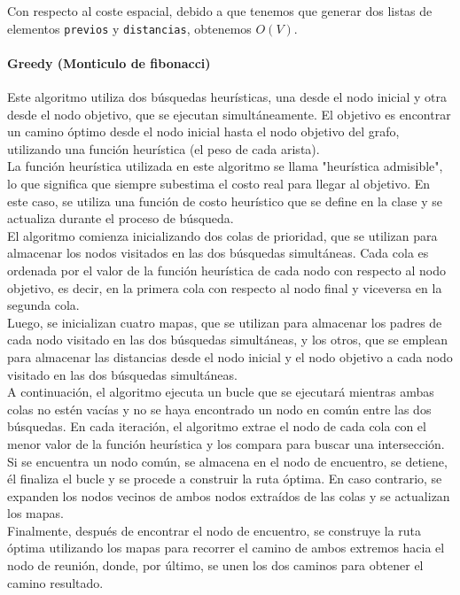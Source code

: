 Con respecto al coste espacial, debido a que tenemos que generar dos listas de elementos \texttt{previos} y \texttt{distancias}, obtenemos $O(V)$.

\paragraph{Greedy (Monticulo de fibonacci)}

Este algoritmo utiliza dos búsquedas heurísticas, una desde el nodo inicial y otra desde el nodo objetivo, que se ejecutan simultáneamente. El objetivo es encontrar un camino óptimo desde el nodo inicial hasta el nodo objetivo del grafo, utilizando una función heurística (el peso de cada arista).\\

La función heurística utilizada en este algoritmo se llama "heurística admisible", lo que significa que siempre subestima el costo real para llegar al objetivo. En este caso, se utiliza una función de costo heurístico que se define en la clase  y se actualiza durante el proceso de búsqueda.\\

El algoritmo comienza inicializando dos colas de prioridad, que se utilizan para almacenar los nodos visitados en las dos búsquedas simultáneas. Cada cola es ordenada por el valor de la función heurística de cada nodo con respecto al nodo objetivo, es decir, en la primera cola con respecto al nodo final y viceversa en la segunda cola.\\

Luego, se inicializan  cuatro mapas, que se utilizan para almacenar los padres de cada nodo visitado en las dos búsquedas simultáneas, y los otros, que se emplean para almacenar las distancias desde el nodo inicial y el nodo objetivo a cada nodo visitado en las dos búsquedas simultáneas.\\

A continuación, el algoritmo ejecuta un bucle que se ejecutará mientras ambas colas no estén vacías y no se haya encontrado un nodo en común entre las dos búsquedas. En cada iteración, el algoritmo extrae el nodo de cada cola con el menor valor de la función heurística y los compara para buscar una intersección. Si se encuentra un nodo común, se almacena en el nodo de encuentro, se detiene, él finaliza el bucle y se procede a construir la ruta óptima. En caso contrario, se expanden los nodos vecinos de ambos nodos extraídos de las colas y se actualizan los mapas.\\

Finalmente, después de encontrar el nodo de encuentro, se construye la ruta óptima utilizando los mapas para recorrer el camino de ambos extremos hacia el nodo de reunión, donde, por último, se unen los dos caminos para obtener el camino resultado.\\